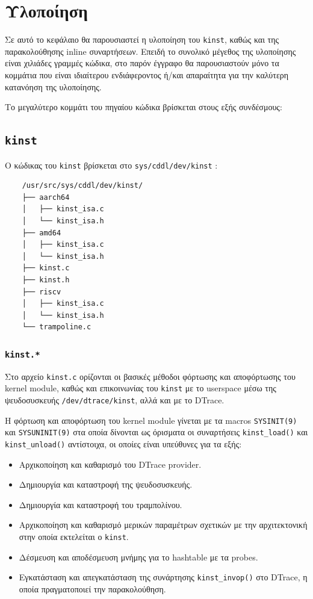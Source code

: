 \documentclass[12pt]{article}
\begin{document}
\section{Υλοποίηση}

Σε αυτό το κεφάλαιο θα παρουσιαστεί η υλοποίηση του \lstinline{kinst}, καθώς
και της παρακολούθησης inline συναρτήσεων. Επειδή το συνολικό μέγεθος της
υλοποίησης είναι χιλιάδες γραμμές κώδικα, στο παρόν έγγραφο θα παρουσιαστούν
μόνο τα κομμάτια που είναι ιδιαίτερου ενδιάφεροντος ή/και απαραίτητα για την
καλύτερη κατανόηση της υλοποίησης.

Το μεγαλύτερο κομμάτι του πηγαίου κώδικα βρίσκεται στους εξής συνδέσμους:
\cite{kinstsrc} \cite{inlinesrc} \cite{testsrc}

\subsection{\lstinline{kinst}}

O κώδικας του \lstinline{kinst} βρίσκεται στο \lstinline{sys/cddl/dev/kinst}
\cite{kinstsrc}:

\begin{Verbatim}
	/usr/src/sys/cddl/dev/kinst/
	├── aarch64
	│   ├── kinst_isa.c
	│   └── kinst_isa.h
	├── amd64
	│   ├── kinst_isa.c
	│   └── kinst_isa.h
	├── kinst.c
	├── kinst.h
	├── riscv
	│   ├── kinst_isa.c
	│   └── kinst_isa.h
	└── trampoline.c
\end{Verbatim}

\subsubsection{\lstinline{kinst.*}} \label{kinstc}

Στο αρχείο \lstinline{kinst.c} ορίζονται οι βασικές μέθοδοι φόρτωσης και
αποφόρτωσης του kernel module, καθώς και επικοινωνίας του \lstinline{kinst} με
το userspace μέσω της ψευδοσυσκευής \lstinline{/dev/dtrace/kinst}, αλλά και με
το DTrace.

Η φόρτωση και αποφόρτωση του kernel module γίνεται με τα macros
\lstinline{SYSINIT(9)} και \lstinline{SYSUNINIT(9)} στα οποία δίνονται ως
όρισματα οι συναρτήσεις \lstinline{kinst_load()} και \lstinline{kinst_unload()}
αντίστοιχα, οι οποίες είναι υπεύθυνες για τα εξής:

\begin{itemize}
	\item Αρχικοποίηση και καθαρισμό του DTrace provider.
	\item Δημιουργία και καταστροφή της ψευδοσυσκευής.
	\item Δημιουργία και καταστροφή του τραμπολίνου.
	\item Αρχικοποίηση και καθαρισμό μερικών παραμέτρων σχετικών με την
		αρχιτεκτονική στην οποία εκτελείται ο \lstinline{kinst}.
	\item Δέσμευση και αποδέσμευση μνήμης για το hashtable με τα probes.
	\item Εγκατάσταση και απεγκατάσταση της συνάρτησης
		\lstinline{kinst_invop()} στο DTrace, η οποία πραγματοποιεί την
		παρακολούθηση.
\end{itemize}
\end{document}
